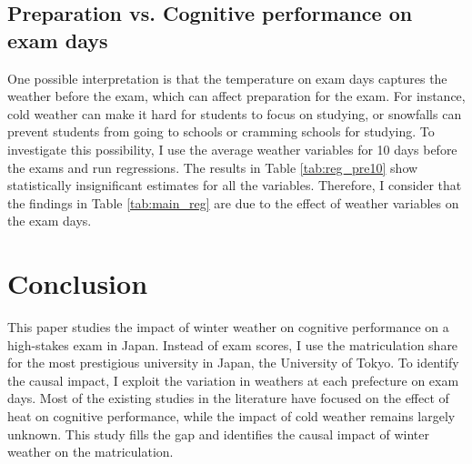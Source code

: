 \documentclass[12pt,letterpaper]{article}
\begin{document}
\subsection{Preparation vs. Cognitive performance on exam days}

One possible interpretation is that the temperature on exam days captures the weather before the exam, which can affect preparation for the exam. 
For instance, cold weather can make it hard for students to focus on studying, or snowfalls can prevent students from going to schools or cramming schools for studying.
To investigate this possibility, I use the average weather variables for 10 days before the exams and run regressions.
The results in Table \ref{tab:reg_pre10} show statistically insignificant estimates for all the variables.
Therefore, I consider that the findings in Table \ref{tab:main_reg} are due to the effect of weather variables on the exam days.

%  

\section{Conclusion}\label{sec:conclusion}

This paper studies the impact of winter weather on cognitive performance on a high-stakes exam in Japan.
Instead of exam scores, I use the matriculation share for the most prestigious university in Japan, the University of Tokyo.
To identify the causal impact, I exploit the variation in weathers at each prefecture on exam days.
Most of the existing studies in the literature have focused on the effect of heat on cognitive performance, while the impact of cold weather remains largely unknown.
This study fills the gap and identifies the causal impact of winter weather on the matriculation.
\end{document}
